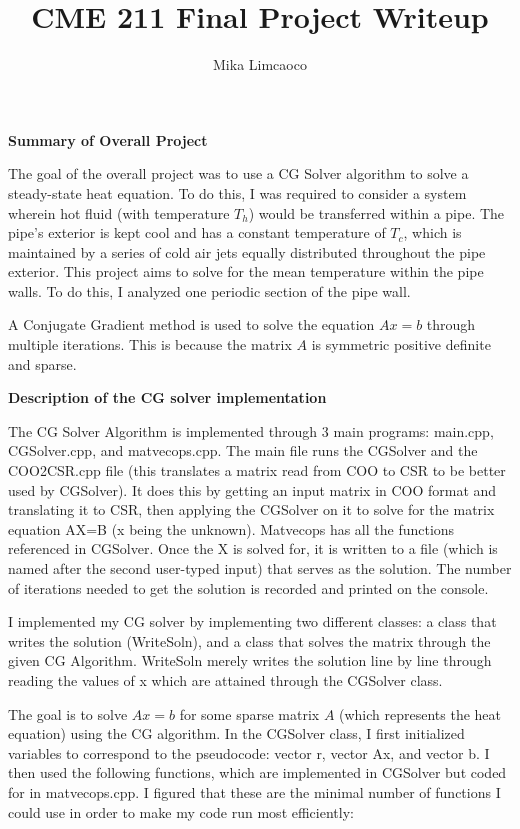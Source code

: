 \documentclass[12pt]{article} %
\title{CME 211 Final Project Writeup}
\author{Mika Limcaoco}
\begin{document}
\maketitle

\noindent
\textbf{\Large{Summary of Overall Project\\}}

The goal of the overall project was to use a CG Solver algorithm to solve a steady-state heat equation. To do this, I was required to consider a system wherein hot fluid (with temperature $T_{h}$) would be transferred within a pipe. The pipe's exterior is kept cool and has a constant temperature of $T_{c}$, which is maintained by a series of cold air jets equally distributed throughout the pipe exterior. This project aims to solve for the mean temperature within the pipe walls. To do this, I analyzed one periodic section of the pipe wall. 

A Conjugate Gradient method is used to solve the equation $Ax = b$ through multiple iterations. This is because the matrix $A$ is symmetric positive definite and sparse. 

\bigskip
\noindent
\textbf{\Large{Description of the CG solver implementation\\}}
\bigskip

The CG Solver Algorithm is implemented through 3 main programs: main.cpp, CGSolver.cpp, and matvecops.cpp. The main file runs the CGSolver and the COO2CSR.cpp file (this translates a matrix read from COO to CSR to be better used by CGSolver). It does this by getting an input matrix in COO format and translating it to CSR, then applying the CGSolver on it to solve for the matrix equation AX=B (x being the unknown). Matvecops has all the functions referenced in CGSolver. Once the X is solved for, it is written to a file (which is named after the second user-typed input) that serves as the solution. The number of iterations needed to get the solution is recorded and printed on the console. 

I implemented my CG solver by implementing two different classes: a class that writes the solution (WriteSoln), and a class that solves the matrix through the given CG Algorithm. WriteSoln merely writes the solution line by line through reading the values of x which are attained through the CGSolver class. 

The goal is to solve $Ax = b$ for some sparse matrix $A$ (which represents the heat equation) using the CG algorithm.  In the CGSolver class, I first initialized variables to correspond to the pseudocode: vector r, vector Ax, and vector b. I then used the following functions, which are implemented in CGSolver but coded for in matvecops.cpp. I figured that these are the minimal number of functions I could use in order to make my code run most efficiently: 
\end{document}
